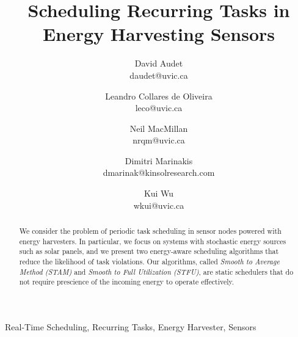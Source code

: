 \documentclass[10pt,conference]{IEEEtran}
\begin{document}
\title{Scheduling Recurring Tasks in Energy Harvesting Sensors}
\author{David Audet\\daudet@uvic.ca \and Leandro {Collares de Oliveira}\\leco@uvic.ca \and Neil MacMillan\\nrqm@uvic.ca \and Dimitri Marinakis\\dmarinak@kinsolresearch.com \and Kui Wu\\wkui@uvic.ca}

\maketitle


\begin{abstract}

We consider the problem of periodic task scheduling in sensor nodes powered with energy harvesters. In particular, we focus on systems with stochastic energy sources such as solar panels, and we present two energy-aware scheduling algorithms that reduce the likelihood of task violations. Our algorithms, called \emph{Smooth to Average Method (\textsc{STAM})} and \emph{Smooth to Full Utilization (\textsc{STFU})}, are static schedulers that do not require prescience of the incoming energy to operate effectively.
\end{abstract}

\begin{IEEEkeywords} Real-Time Scheduling, Recurring Tasks, Energy Harvester, Sensors
\end{IEEEkeywords}

























\end{document}
